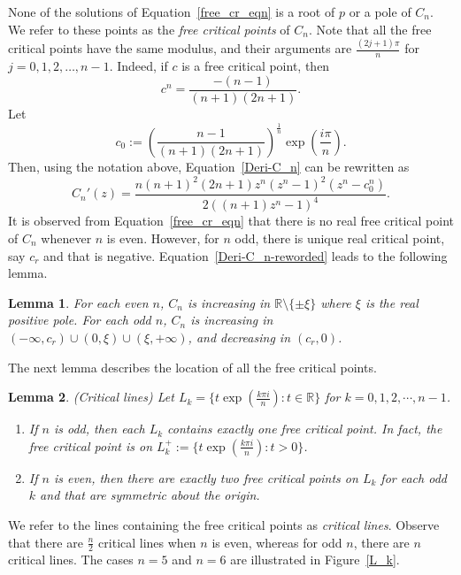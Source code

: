 \documentclass[12pt]{article}
\newtheorem{lem}{Lemma}[section]
\begin{document}
	None of the solutions of Equation~\eqref{free_cr_eqn} is a root of $p$ or a pole of $C_n$. We refer to these points as the \emph{free critical points} of $C_n$.  Note that all the free critical points have the same modulus, and their arguments  are $\frac{(2j+1)\pi}{n}$ for $j=0,1,2, \dots, n-1$. Indeed, if  $c$ is a free critical point, then 
	\begin{equation}
		 c^n=\frac{-(n-1)}{(n+1)(2n+1)}.
		 \label{freecriticalpoint}
	\end{equation} 
	Let 
	\begin{equation*}
		 c_0 := \left( \frac{n-1}{(n+1)(2n+1)}\right)^{\frac{1}{n}}\exp\left(\frac{i \pi}{n}\right).
	\end{equation*}  
 Then, using the notation above, Equation~\eqref{Deri-C_n} can be rewritten as 
\begin{equation}
	C_n '(z) =\frac{n(n+1)^2(2n+1)z^n(z^n-1)^2 (z^n-c_0 ^n)}{2((n+1)z^n-1)^4}.
	\label{Deri-C_n-reworded}
\end{equation}
It is observed from Equation~\eqref{free_cr_eqn} that there is no real free critical point of $C_n$ whenever $n$ is even. However, for $n$ odd, there is unique real critical point, say $c_r$ and that is negative. Equation~\eqref{Deri-C_n-reworded} leads to the following lemma.
\begin{lem}
	For each even $n$, $C_n$ is increasing in $\mathbb{R} \setminus \{\pm \xi\}$ where $\xi$ is the real positive pole. For each odd $n$, $C_n$ is increasing in $(-\infty, c_r) \cup (0, \xi) \cup (\xi, +\infty)$, and decreasing in $(c_r, 0)$.
	\label{Cn-increasing-decreasing}
\end{lem}
The next lemma describes the location of all the free critical points.
\begin{lem}(Critical lines) Let $L_k = \{t \exp(\frac{k \pi i}{n}): t \in \mathbb{R}\}$ for $k=0,1,2,\cdots, n-1$.
	\begin{enumerate} 
	   \item If $n$ is odd, then each $ L_k$  contains exactly one free critical point. In fact, the free critical point is on $L_k ^+ := \{t \exp(\frac{k \pi i}{n}): t >0\}$.
	   \item If $n$ is even, then there are exactly two free critical points on $L_k$ for each odd $k$ and that are symmetric about the origin.
	\end{enumerate}
	\label{criticallines}
\end{lem}
 We refer to the lines containing the free critical points as \textit{critical lines}. Observe that there are $\frac{n}{2}$ critical lines when $n$ is even, whereas for odd $n$, there are $n$ critical lines.
The cases $n=5$ and $n=6$ are illustrated in Figure~\ref{L_k}. 
 
\end{document}
